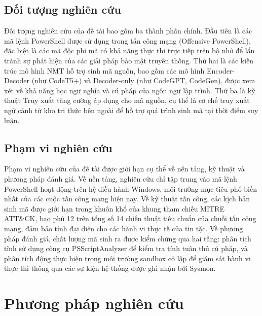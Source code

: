 \subsection{Đối tượng nghiên cứu}

Đối tượng nghiên cứu của đề tài bao gồm ba thành phần chính. Đầu tiên là các mã lệnh PowerShell được sử dụng trong tấn công mạng (Offensive PowerShell), đặc biệt là các mã độc phi mã có khả năng thực thi trực tiếp trên bộ nhớ để lẩn tránh sự phát hiện của các giải pháp bảo mật truyền thống. Thứ hai là các kiến trúc mô hình NMT hỗ trợ sinh mã nguồn, bao gồm các mô hình Encoder-Decoder (như CodeT5+) và Decoder-only (như CodeGPT, CodeGen), được xem xét về khả năng học ngữ nghĩa và cú pháp của ngôn ngữ lập trình. Thứ ba là kỹ thuật Truy xuất tăng cường áp dụng cho mã nguồn, cụ thể là cơ chế truy xuất ngữ cảnh từ kho tri thức bên ngoài để hỗ trợ quá trình sinh mã tại thời điểm suy luận.

\subsection{Phạm vi nghiên cứu}

Phạm vi nghiên cứu của đề tài được giới hạn cụ thể về nền tảng, kỹ thuật và phương pháp đánh giá. Về nền tảng, nghiên cứu chỉ tập trung vào mã lệnh PowerShell hoạt động trên hệ điều hành Windows, môi trường mục tiêu phổ biến nhất của các cuộc tấn công mạng hiện nay. Về kỹ thuật tấn công, các kịch bản sinh mã được giới hạn trong khuôn khổ của khung tham chiếu MITRE ATT\&CK, bao phủ 12 trên tổng số 14 chiến thuật tiêu chuẩn của chuỗi tấn công mạng, đảm bảo tính đại diện cho các hành vi thực tế của tin tặc. Về phương pháp đánh giá, chất lượng mã sinh ra được kiểm chứng qua hai tầng: phân tích tĩnh sử dụng công cụ PSScriptAnalyzer để kiểm tra tính tuân thủ cú pháp, và phân tích động thực hiện trong môi trường sandbox cô lập để giám sát hành vi thực thi thông qua các sự kiện hệ thống được ghi nhận bởi Sysmon.


\section{Phương pháp nghiên cứu}

